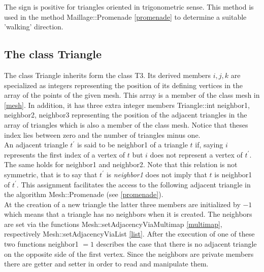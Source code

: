 \documentclass[10pt]{article}
\begin{document}
The sign is positive for triangles oriented in trigonometric sense. This method is used in the method {\ttfamily Maillage::Promenade} \ref{promenade} to determine a suitable 'walking' direction.


\subsection{The class Triangle} \label{triangle}
The class Triangle inherits form the class T3. Its derived members $ i,j,k $ are specialized as integers representing the position of its defining vertices in the array of the points of the given mesh. This array is a member of the class mesh in \ref{mesh}. In addition, it has three extra integer members {\ttfamily Triangle::int neighbor1, neighbor2, neighbor3} representing the position of the adjacent triangles in the array of triangles which is also a member of the class mesh. Notice that theses index lies between zero and the number of triangles minus one. \\
 An adjacent triangle $ t^{'} $ is said to be  {\ttfamily neighbor1} of a triangle $ t $ if, saying $ i $ represents the first index of a vertex of $t$ but $i$ does not represent a vertex of $ t^{'} $. The same holds for {\ttfamily neighbor1} and {\ttfamily neighbor2}. Note that this relation is not symmetric, that is to say that $ t^{'} $ is {\itshape neighbor1} does not imply that $t$ is {\ttfamily neighbor1} of $t^{'}$. 
This assignment facilitates the access to the following adjacent triangle in the algorithm {\ttfamily Mesh::Promenade} (see \ref{promenade}).  \\
At the creation of a new triangle the latter three members are initialized by $ -1 $ which means that a triangle has no neighbors when it is created. The neighbors are set via the functions {\ttfamily Mesh::setAdjacencyViaMultimap} \ref{multimap}, respectively {\ttfamily Mesh::setAdjacencyViaList} \ref{list}. After the execution of one of these two functions {\ttfamily neighbor1 $ = 1$} describes the case that there is no adjacent triangle on the opposite side of the first vertex. 
Since the neighbors are private members there are getter and setter in order to read and manipulate them. \\
\end{document}
